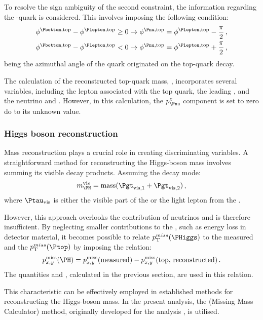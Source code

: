 To resolve the sign ambiguity of the second constraint, the information regarding 
the \Pbottom-quark is considered. This involves imposing the following condition:
\begin{align*}
  \phibtop-\philtop \geq 0 & \rightarrow \phinutop=\philtop-\frac{\pi}{2}\,,\\
  \phibtop-\philtop < 0  & \rightarrow \phinutop=\philtop+\frac{\pi}{2}\, ,
\end{align*}
being \phibtop the azimuthal angle of the \Pbottom quark originated on the top-quark
decay.

The calculation of the reconstructed top-quark mass, \toprecomass, incorporates several 
variables, including the lepton associated with the top quark, the leading \bjet, and the 
neutrino \pnutopT and \phinutop. However, in this calculation, the $p^{z}_{\Pnu}$
component is set to zero do to its unknown value.

\subsubsection{Higgs boson reconstruction}
Mass reconstruction plays a crucial role in creating discriminating variables. 
A straightforward method for reconstructing the Higgs-boson mass involves 
summing its visible decay products. Assuming the \Htautau decay mode:
\begin{equation}
\Hvismass = \text{mass}(\Pgt_{\text{vis}, 1} + \Pgt_{\text{vis}, 2}) \, ,
\end{equation}
where  $\tauvis$ is either the visible part of the \tauhad
or the light lepton from the \taulep.

However, this approach overlooks the contribution of neutrinos and is therefore insufficient. 
By neglecting smaller contributions to the \MET, such as energy loss in detector material, 
it becomes possible to relate $\pT^{miss}(\PHiggs)$ to the measured \MET and the 
$\pT^{miss}(\Ptop)$ by imposing the relation:
\begin{equation*}
    p^{\text{miss}}_{x,y}(\PH) = p^{\text{miss}}_{x,y}(\text{measured})
      - p^{\text{miss}}_{x,y}(\text{top, reconstructed})\,.
\end{equation*}
The quantities \pnutopT and \phinutop, calculated in the previous section, are used in this relation.

This characteristic can be effectively employed in established methods for reconstructing 
the Higgs-boson mass. In the present analysis, the \MMC (Missing Mass Calculator) method, 
originally developed for the \Htautau analysis \cite{ELAGIN2011481}, is utilised.

